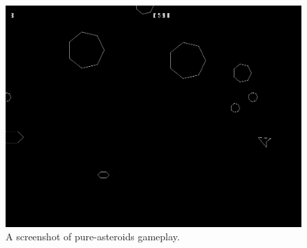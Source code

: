 \documentclass[
  digital, %
  color,   %
  table,   %
  oneside, %
  lof,     %
  lot,     %
]{fithesis3}
\begin{document}
\begin{figure}[hbt!]
    \centering
    \includegraphics[width=0.6 \textwidth]{images/pure-screenshot.png}
    \caption{A screenshot of pure-asteroids gameplay.}
    \label{fig:pureasteroidsscreenshot}
\end{figure}
\end{document}
